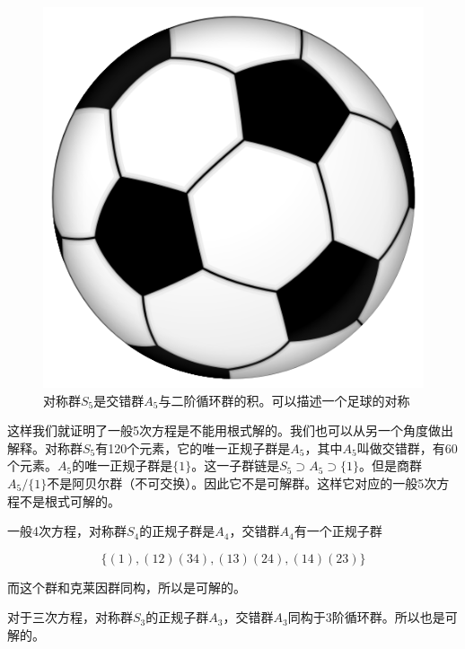\documentclass[b5paper]{ctexart}
\begin{document}
\begin{figure}[htbp]
 \centering
 \includegraphics[scale=0.3]{img/Soccer-ball.png}
 \captionsetup{labelformat=empty}
 \caption{对称群$S_5$是交错群$A_5$与二阶循环群的积。可以描述一个足球的对称}
 \label{fig:S5}
\end{figure}

这样我们就证明了一般5次方程是不能用根式解的。我们也可以从另一个角度做出解释。对称群$S_5$有120个元素，它的唯一正规子群是$A_5$，其中$A_5$叫做交错群，有60个元素。$A_5$的唯一正规子群是$\{1\}$。这一子群链是$S_5 \supset A_5 \supset \{1\}$。但是商群$A_5/\{1\}$不是阿贝尔群（不可交换）。因此它不是可解群。这样它对应的一般5次方程不是根式可解的。

一般4次方程，对称群$S_4$的正规子群是$A_4$，交错群$A_4$有一个正规子群

\[
\{(1), (1 2)(3 4), (1 3)(2 4), (1 4)(2 3)\}
\]

而这个群和克莱因群同构，所以是可解的。

对于三次方程，对称群$S_3$的正规子群$A_3$，交错群$A_3$同构于3阶循环群。所以也是可解的。
\end{document}
